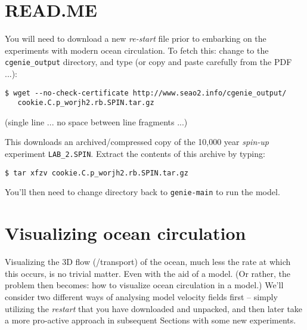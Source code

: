 \newpage

\section*{READ.ME}

You will need to download a new \textit{re-start} file prior to embarking on the experiments with modern ocean circulation.
To fetch this: change to the \texttt{cgenie\_output} directory, and type (or copy and paste carefully from the PDF ...):

\vspace{-2mm}\small\begin{verbatim}
$ wget --no-check-certificate http://www.seao2.info/cgenie_output/
   cookie.C.p_worjh2.rb.SPIN.tar.gz
\end{verbatim}\normalsize\vspace{-2mm}
(single line ... no space between line fragments ...)

This downloads an archived/compressed copy of the 10,000 year \textit{spin-up} experiment \texttt{LAB\_2.SPIN}. Extract the contents of this archive by typing:

\vspace{-2mm}
\begin{verbatim}
$ tar xfzv cookie.C.p_worjh2.rb.SPIN.tar.gz
\end{verbatim}
\vspace{-2mm}

You’ll then need to change directory back to \texttt{genie-main} to run the model.

\newpage

\section{Visualizing ocean circulation}

Visualizing the 3D flow (/transport) of the ocean, much less the rate at which this occurs, is no trivial matter. Even with the aid of a model. (Or rather, the problem then becomes: how to visualize ocean circulation in a model.) We'll consider two different ways of analysing model velocity fields first -- simply utilizing the \textit{restart} that you have downloaded and unpacked, and then later take a more pro-active approach in subsequent Sections with some new experiments.

